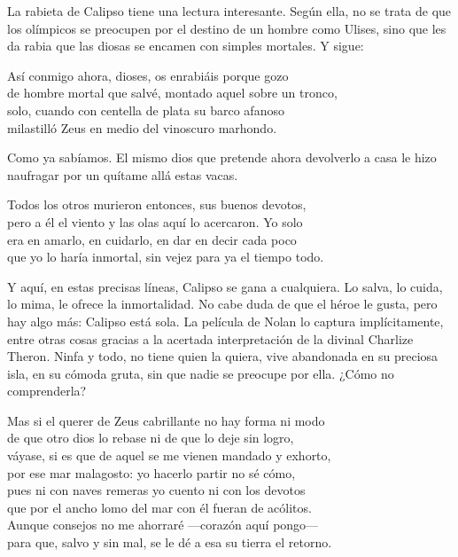 La rabieta de Calipso tiene una lectura interesante. Según ella, no se trata de que los olímpicos se preocupen por el destino de un hombre como Ulises, sino que les da rabia que las diosas se encamen con simples mortales. Y sigue:

\begin{versocita}
Así conmigo ahora, dioses, os enrabiáis porque gozo\\
de hombre mortal que salvé, montado aquel sobre un tronco,\\
solo, cuando con centella de plata su barco afanoso\\
milastilló Zeus en medio del vinoscuro marhondo.
\end{versocita}


Como ya sabíamos. El mismo dios que pretende ahora devolverlo a casa le hizo naufragar por un quítame allá estas vacas.

\begin{versocita}
Todos los otros murieron entonces, sus buenos devotos,\\
pero a él el viento y las olas aquí lo acercaron. Yo solo\\
era en amarlo, en cuidarlo, en dar en decir cada poco\\
que yo lo haría inmortal, sin vejez para ya el tiempo todo.
\end{versocita}

Y aquí, en estas precisas líneas, Calipso se gana a cualquiera. Lo salva, lo cuida, lo mima, le ofrece la inmortalidad. No cabe duda de que el héroe le gusta, pero hay algo más: Calipso está sola. La película de Nolan lo captura implícitamente, entre otras cosas gracias a la acertada interpretación de la divinal Charlize Theron. Ninfa y todo, no tiene quien la quiera, vive abandonada en su preciosa isla, en su cómoda gruta, sin que nadie se preocupe por ella. ¿Cómo no comprenderla?

\begin{versocita}
Mas si el querer de Zeus cabrillante no hay forma ni modo\\
de que otro dios lo rebase ni de que lo deje sin logro,\\
váyase, si es que de aquel se me vienen mandado y exhorto,\\
por ese mar malagosto: yo hacerlo partir no sé cómo,\\
pues ni con naves remeras yo cuento ni con los devotos\\
que por el ancho lomo del mar con él fueran de acólitos.\\
Aunque consejos no me ahorraré ---corazón aquí pongo---\\
para que, salvo y sin mal, se le dé a esa su tierra el retorno.
\end{versocita}

